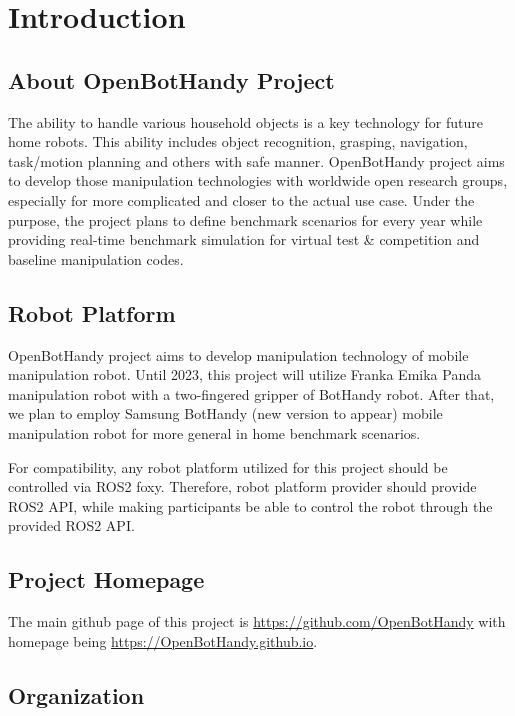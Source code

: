 \chapter{Introduction}
\label{chap:intro}


\section{About OpenBotHandy Project}

The ability to handle various household objects is a key technology for future home robots.
This ability includes object recognition, grasping, navigation, task/motion planning and others with safe manner.
OpenBotHandy project aims to develop those manipulation technologies with worldwide open research groups,
especially for more complicated and closer to the actual use case.
Under the purpose, the project plans to define benchmark scenarios for every year while providing real-time benchmark simulation for virtual test \& competition
and baseline manipulation codes.


\section{Robot Platform}

OpenBotHandy project aims to develop manipulation technology of mobile manipulation robot.
Until 2023, this project will utilize Franka Emika Panda manipulation robot with a two-fingered gripper of BotHandy robot.
After that, we plan to employ Samsung BotHandy (new version to appear) mobile manipulation robot for more general in home benchmark scenarios.

For compatibility, any robot platform utilized for this project should be controlled via ROS2 foxy.
Therefore, robot platform provider should provide ROS2 API, 
while making participants be able to control the robot through the provided ROS2 API.


\section{Project Homepage}

The main github page of this project is \textcolor{blue}{\url{https://github.com/OpenBotHandy}}
with homepage being \textcolor{blue}{\url{https://OpenBotHandy.github.io}}.


\section{Organization}


